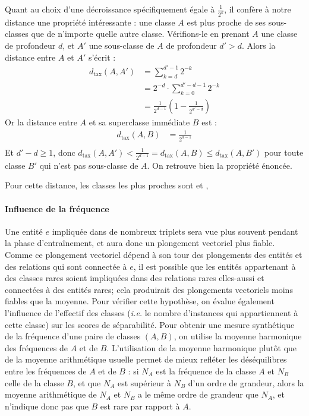 Quant au choix d'une décroissance spécifiquement égale à $\frac{1}{2^k}$, il confère à notre distance une propriété intéressante : une classe $A$ est plus proche de ses sous-classes que de n'importe quelle autre classe. Vérifions-le en prenant $A$ une classe de profondeur $d$, et $A'$ une sous-classe de $A$ de profondeur $d' > d$. Alors la distance entre $A$ et $A'$ s'écrit :
\begin{align*}
    d_\text{tax}(A, A') &= \sum_{k = d}^{d'-1} 2^{-k} \\
    &= 2^{-d} \cdot \sum_{k=0}^{d'-d-1} 2^{-k} \\
    &= \frac{1}{2^{d-1}} \left(1 - \frac{1}{2^{d'-d}} \right) 
\end{align*}
Or la distance entre $A$ et sa superclasse immédiate $B$ est :
\begin{align*}
    d_\text{tax}(A, B) &= \frac{1}{2^{d-1}} \\
\end{align*}
Et $d'-d \geq 1$, donc $d_\text{tax}(A, A') < \frac{1}{2^{d-1}} = d_\text{tax}(A, B) \leq d_\text{tax}(A, B')$ pour toute classe $B'$ qui n'est pas sous-classe de $A$. On retrouve bien la propriété énoncée.

Pour cette distance, les classes les plus proches sont  et , 

\paragraph{Influence de la fréquence}

Une entité $e$ impliquée dans de nombreux triplets sera vue plus souvent pendant la phase d'entraînement, et aura donc un plongement vectoriel plus fiable. Comme ce plongement vectoriel dépend à son tour des plongements des entités et des relations qui sont connectée à $e$, il est possible que les entités appartenant à des classes rares soient impliquées dans des relations rares elles-aussi et connectées à des entités rares; cela produirait des plongements vectoriels moins fiables que la moyenne. Pour vérifier cette hypothèse, on évalue également l'influence de l'effectif des classes (\textit{i.e.} le nombre d'instances qui appartiennent à cette classe) sur les scores de séparabilité. Pour obtenir une mesure synthétique de la fréquence d'une paire de classes $(A, B)$, on utilise la moyenne harmonique des fréquences de $A$ et de $B$. L'utilisation de la moyenne harmonique plutôt que de la moyenne arithmétique usuelle permet de mieux refléter les déséquilibres entre les fréquences de $A$ et de $B$ : si $N_A$ est la fréquence de la classe $A$ et $N_B$ celle de la classe $B$, et que $N_A$ est supérieur à $N_B$ d'un ordre de grandeur, alors la moyenne arithmétique de $N_A$ et $N_B$ a le même ordre de grandeur que $N_A$, et n'indique donc pas que $B$ est rare par rapport à $A$.

